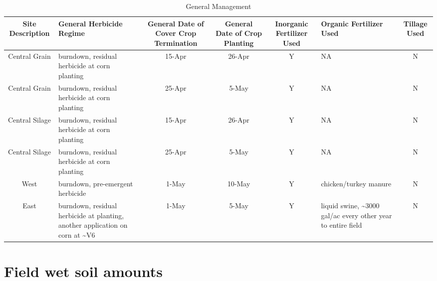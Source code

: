 \documentclass[]{article}
\begin{document}
\begin{table}[H]

\caption{\label{tab:unnamed-chunk-3}General Management}
\centering
\begin{tabular}[t]{c>{\centering\arraybackslash}p{10em}ccc>{\centering\arraybackslash}p{10em}c}
\toprule
Site Description & General Herbicide Regime & General Date of Cover Crop Termination & General Date of Crop Planting & Inorganic Fertilizer Used & Organic Fertilizer Used & Tillage Used\\
\midrule
\rowcolor{gray!6}  Central Grain & burndown, residual herbicide at corn planting & 15-Apr & 26-Apr & Y & NA & N\\
Central Grain & burndown, residual herbicide at corn planting & 25-Apr & 5-May & Y & NA & N\\
\rowcolor{gray!6}  Central Silage & burndown, residual herbicide at corn planting & 15-Apr & 26-Apr & Y & NA & N\\
Central Silage & burndown, residual herbicide at corn planting & 25-Apr & 5-May & Y & NA & N\\
\rowcolor{gray!6}  West & burndown, pre-emergent herbicide & 1-May & 10-May & Y & chicken/turkey manure & N\\
\addlinespace
East & burndown, residual herbicide at planting, another application on corn at \textasciitilde{}V6 & 1-May & 5-May & Y & liquid swine, \textasciitilde{}3000 gal/ac every other year to entire field & N\\
\bottomrule
\end{tabular}
\end{table}

\newpage

\hypertarget{field-wet-soil-amounts}{%
\section{Field wet soil amounts}\label{field-wet-soil-amounts}}
\end{document}
